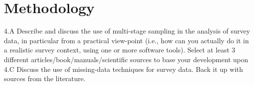 \section{Methodology}
4.A Describe and discuss the use of multi-stage sampling in the analysis of survey data, in particular from a practical view-point (i.e., how can you actually do it in a realistic survey context, using one or more software tools). Select at least 3 different articles/book/manuals/scientific sources to base your development upon
4.C Discuss the use of missing-data techniques for survey data. Back it up with sources from the literature.
\endinput